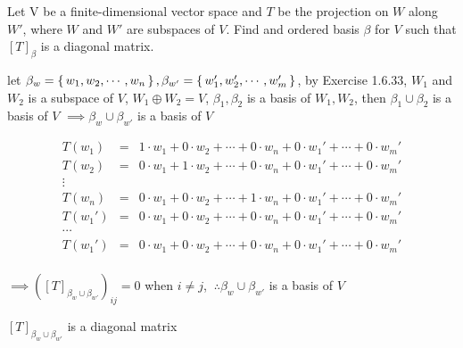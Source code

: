 Let V be a finite-dimensional vector space and $T$ be the projection on $W$ along $W'$, where $W$ and $W'$ are subspaces of $V$. Find and ordered basis $\beta$ for $V$ such that $[T]_{\beta}$ is a diagonal matrix.

\begin{tcolorbox}
	let $\beta_w = \left\{ \,w_1,w_2,\cdots,w_n \,\right\}, \beta_{w'} = \left\{ \,w_1',w_2',\cdots,w_m' \,\right\}$, by Exercise 1.6.33, $W_1$ and $W_2$ is a subspace of $V$, $W_1 \oplus W_2 = V$, $\beta_1 , \beta_2$ is a basis of $W_1,W_2$, then $\beta_1 \cup \beta_2$ is a basis of $V$ $\implies \beta_w \cup \beta_{w'}$ is a basis of $V$
	
	\begin{eqnarray*}
		T(w_1) &=& 1 \cdot w_1 + 0 \cdot w_2 + \cdots + 0 \cdot w_n + 0 \cdot w_1' + \cdots + 0 \cdot w_m'\\
		T(w_2) &=& 0 \cdot w_1 + 1 \cdot w_2 + \cdots + 0 \cdot w_n + 0 \cdot w_1' + \cdots + 0 \cdot w_m'\\
		\vdots\\
		T(w_n) &=& 0 \cdot w_1 + 0 \cdot w_2 + \cdots + 1 \cdot w_n + 0 \cdot w_1' + \cdots + 0 \cdot w_m'\\
		T(w_1') &=& 0 \cdot w_1 + 0 \cdot w_2 + \cdots + 0 \cdot w_n + 0 \cdot w_1' + \cdots + 0 \cdot w_m'\\
		\cdots\\
		T(w_1') &=& 0 \cdot w_1 + 0 \cdot w_2 + \cdots + 0 \cdot w_n + 0 \cdot w_1' + \cdots + 0 \cdot w_m'\\
	\end{eqnarray*}
	
	$\implies \left( [T]_{\beta_w \cup \beta_{w'}}  \right)_{ij} = 0$ when $i \neq j$, $~\therefore \beta_w \cup \beta_{w'}$ is a basis of $V$
	
	$[T]_{\beta_w \cup \beta_{w'}}$ is a diagonal matrix	
\end{tcolorbox}